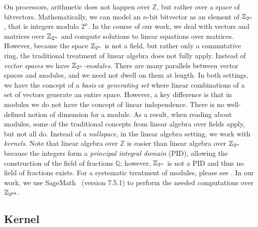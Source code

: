 On processors, arithmetic does not happen over $\mathbb{Z}$, but
rather over a space of bitvectors. Mathematically, we can model
an $n$-bit bitvector as an element of $\mathbb{Z}_{2^{n}}$, that is integers
modulo $2^n$. In the course of our work, we deal with vectors and
matrices over $\mathbb{Z}_{2^{n}}$ and compute solutions to linear equations over
matrices. However, because the space $\mathbb{Z}_{2^{n}}$ is not a field, but
rather only a commutative ring, the traditional treatment of linear
algebra does not fully apply. Instead of \emph{vector spaces} we
have \emph{$\mathbb{Z}_{2^{n}}$-modules}. There are many parallels between vector
spaces and modules, and we need not dwell on them at length. In both
settings, we have the concept of a \emph{basis} or \emph{generating
set} where linear combinations of a set of vectors generate an entire
space. However, a key difference is that in modules we do not have the
concept of linear independence. There is no well-defined notion of
dimension for a module. As a result, when reading about modules, some
of the traditional concepts from linear algebra over fields apply,
but not all do. Instead of a \emph{nullspace}, in the linear algebra
setting, we work with \emph{kernels}. Note that linear algebra over
$\mathbb{Z}$ is easier than linear algebra over $\mathbb{Z}_{2^{n}}$ because the
integers form a \emph{principal integral domain} (PID), allowing the
construction of the field of fractions $\mathbb{Q}$; however, $\mathbb{Z}_{2^{n}}$
is not a PID and thus no field of fractions exists. For a systematic
treatment of modules, please see . In our work,
we use SageMath~\cite{sagemath} (version 7.5.1) to perform the needed
computations over $\mathbb{Z}_{2^{64}}$.

\subsection{Kernel}

